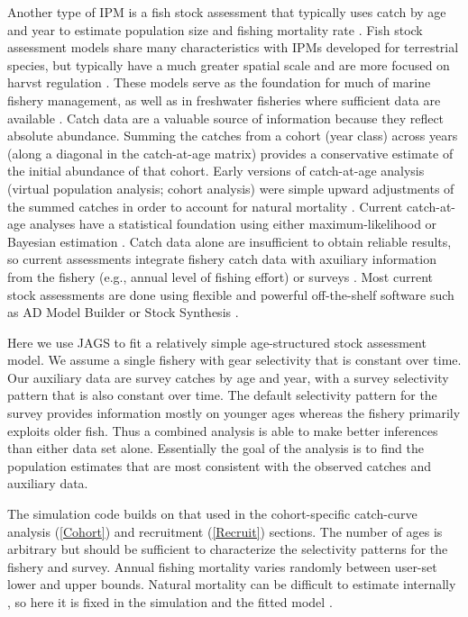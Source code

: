 \documentclass[
]{krantz}
\begin{document}
Another type of IPM is a fish stock assessment that typically uses catch by age and year to estimate population size and fishing mortality rate \citep{schaub.etal_2024}. Fish stock assessment models share many characteristics with IPMs developed for terrestrial species, but typically have a much greater spatial scale and are more focused on harvst regulation \citep{schaub.etal_2024}. These models serve as the foundation for much of marine fishery management, as well as in freshwater fisheries where sufficient data are available \citep[e.g.,][]{fielder.bence_2014}. Catch data are a valuable source of information because they reflect absolute abundance. Summing the catches from a cohort (year class) across years (along a diagonal in the catch-at-age matrix) provides a conservative estimate of the initial abundance of that cohort. Early versions of catch-at-age analysis (virtual population analysis; cohort analysis) were simple upward adjustments of the summed catches in order to account for natural mortality \citep{ricker1975}. Current catch-at-age analyses have a statistical foundation using either maximum-likelihood or Bayesian estimation \citep{maunder.punt_2013}. Catch data alone are insufficient to obtain reliable results, so current assessments integrate fishery catch data with axuiliary information from the fishery (e.g., annual level of fishing effort) or surveys \citep{deriso.etal_1985, maunder.punt_2013, schaub.etal_2024}. Most current stock assessments are done using flexible and powerful off-the-shelf software such as AD Model Builder or Stock Synthesis \citep{fournier.etal_2012, methot.wetzell_2013}.

Here we use JAGS to fit a relatively simple age-structured stock assessment model. We assume a single fishery with gear selectivity that is constant over time. Our auxiliary data are survey catches by age and year, with a survey selectivity pattern that is also constant over time. The default selectivity pattern for the survey provides information mostly on younger ages whereas the fishery primarily exploits older fish. Thus a combined analysis is able to make better inferences than either data set alone. Essentially the goal of the analysis is to find the population estimates that are most consistent with the observed catches and auxiliary data.

The simulation code builds on that used in the cohort-specific catch-curve analysis (\ref{Cohort}) and recruitment (\ref{Recruit}) sections. The number of ages is arbitrary but should be sufficient to characterize the selectivity patterns for the fishery and survey. Annual fishing mortality varies randomly between user-set lower and upper bounds. Natural mortality can be difficult to estimate internally \citep{quinn.deriso_1999, schaub.etal_2024}, so here it is fixed in the simulation and the fitted model \citep[e.g., using external information such as longevity:][]{lorenzen1996, then.etal_2015}.
\end{document}

